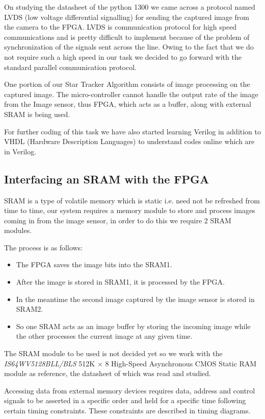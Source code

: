 \documentclass[../../main.tex]{subfiles}
\begin{document}
On studying the datasheet of the python 1300 we came across a protocol named LVDS (low voltage differential signalling) for sending the captured image from the camera to the FPGA. LVDS is communication protocol for high speed communications and is pretty difficult to implement because of the problem of synchronization of the signals sent across the line. Owing to the fact that we do not require such a high speed in our task we decided to go forward with the standard parallel communication protocol.

One portion of our Star Tracker Algorithm consists of image processing on the captured image.  The micro-controller cannot handle the output rate of the image from the Image sensor, thus FPGA, which acts as a buffer, along with external SRAM is being used. %

For further coding of this task we have also started learning Verilog in addition to VHDL (Hardware Description Languages) to understand codes online which are in Verilog.

\subsection{Interfacing an SRAM with the FPGA}
SRAM is a type of volatile memory which is static i.e. need not be refreshed from time to time, our system requires a memory module to store and process images coming in from the image sensor, in order to do this we require 2 SRAM modules.

The process is as follows:
\begin{itemize}
    \item The FPGA saves the image bits into the SRAM1.
    \item After the image is stored in SRAM1, it is processed by the FPGA.
    \item In the meantime the second image captured by the image sensor is stored in SRAM2.
    \item So one SRAM acts as an image buffer by storing the incoming image while the other processes the current image at any given time.
\end{itemize}

The SRAM module to be used is not decided yet so we work with the \textit{IS64WV5128BLL/BLS} 512K \(\times\) 8 High-Speed Asynchronous CMOS Static RAM module as reference, the datasheet of which was read and studied.

Accessing data from external memory devices requires data, address and control signals to be asserted in a specific order and held for a specific time following certain timing constraints. These constraints are described in timing diagrams.
\end{document}
